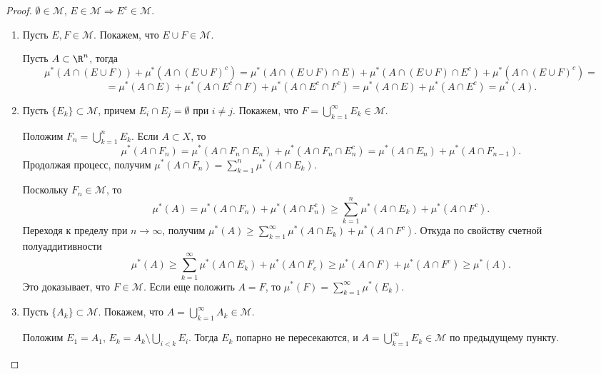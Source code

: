 \begin{proof}
    $\emptyset \in \mathcal{M}$, $E \in \mathcal{M} \Rightarrow E^{c} \in \mathcal{M}$.

    \begin{enumerate}
        \item Пусть $E, F \in \mathcal{M}$. Покажем, что $E \cup F \in \mathcal{M}$.

        Пусть $A \subset \R^{n}$, тогда
        \[\mu^{*}(A \cap (E \cup F)) + \mu^{*}(A \cap (E \cup F)^{c}) = \mu^{*}(A \cap (E \cup F) \cap E) + \mu^{*}(A \cap (E \cup F) \cap E^{c}) + \mu^{*}(A \cap (E \cup F)^{c}) =\] \[= \mu^{*}(A \cap E) + \mu^{*}(A \cap E^{c} \cap F) + \mu^{*}(A \cap E^{c} \cap F^{c}) = \mu^{*}(A \cap E) + \mu^{*}(A \cap E^{c}) = \mu^{*}(A).\]

        \item Пусть $\{E_{k}\} \subset \mathcal{M}$, причем $E_{i} \cap E_{j} = \emptyset$ при $i \neq j$. Покажем, что $F = \bigcup_{k = 1}^{\infty} E_{k} \in \mathcal{M}$.

        Положим $F_{n} = \bigcup_{k = 1}^{n}E_{k}$. Если $A \subset X$, то
        \[\mu^{*}(A \cap F_{n}) = \mu^{*}(A \cap F_{n} \cap E_{n}) + \mu^{*}(A \cap F_{n} \cap E_{n}^{c}) = \mu^{*}(A \cap E_{n}) + \mu^{*}(A \cap F_{n - 1}).\]
        Продолжая процесс, получим $\mu^{*}(A \cap F_{n}) = \sum_{k = 1}^{n}\mu^{*}(A \cap E_{k})$.

        Поскольку $F_{n} \in \mathcal{M}$, то
        \[\mu^{*}(A) = \mu^{*}(A \cap F_{n}) + \mu^{*}(A \cap F_{n}^{c}) \geq \sum_{k = 1}^{n} \mu^{*}(A \cap E_{k}) + \mu^{*}(A \cap F^{c}).\]
        Переходя к пределу при $n \to \infty$, получим $\mu^{*}(A) \geq \sum_{k = 1}^{\infty}\mu^{*}(A \cap E_{k}) + \mu^{*}(A \cap F^{c})$. Откуда по свойству счетной полуаддитивности
        \[\mu^{*}(A) \geq \sum_{k = 1}^{\infty}\mu^{*}(A \cap E_{k}) + \mu^{*}(A \cap F_{c}) \geq \mu^{*}(A \cap F) + \mu^{*}(A \cap F^{c}) \geq \mu^{*}(A).\]
        Это доказывает, что $F \in \mathcal{M}$. Если еще положить $A = F$, то $\mu^{*}(F) = \sum_{k = 1}^{\infty}\mu^{*}(E_{k})$.

        \item Пусть $\{A_{k}\} \subset \mathcal{M}$. Покажем, что $A = \bigcup_{k = 1}^{\infty}A_{k} \in \mathcal{M}$.

        Положим $E_{1} = A_{1}$, $E_{k} = A_{k} \setminus \bigcup_{i < k} E_{i}$. Тогда $E_{k}$ попарно не пересекаются, и $A = \bigcup_{k = 1}^{\infty}E_{k} \in \mathcal{M}$ по предыдущему пункту.
    \end{enumerate}
\end{proof}

